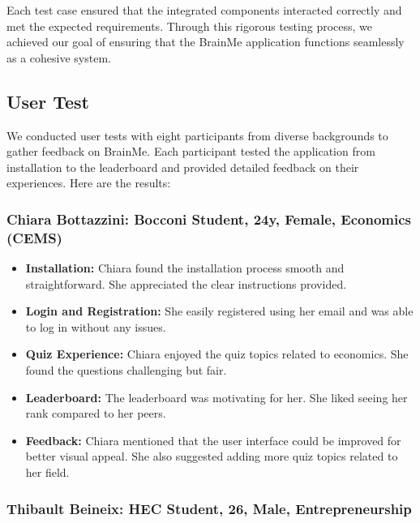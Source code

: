 Each test case ensured that the integrated components interacted correctly and met the expected requirements. Through this rigorous testing process, we achieved our goal of ensuring that the BrainMe application functions seamlessly as a cohesive system.

\subsection{User Test}

We conducted user tests with eight participants from diverse backgrounds to gather feedback on BrainMe. Each participant tested the application from installation to the leaderboard and provided detailed feedback on their experiences. Here are the results:

\subsubsection{Chiara Bottazzini: Bocconi Student, 24y, Female, Economics (CEMS)}

\begin{itemize}
    \item \textbf{Installation:} Chiara found the installation process smooth and straightforward. She appreciated the clear instructions provided.
    \item \textbf{Login and Registration:} She easily registered using her email and was able to log in without any issues. 
    \item \textbf{Quiz Experience:} Chiara enjoyed the quiz topics related to economics. She found the questions challenging but fair. 
    \item \textbf{Leaderboard:} The leaderboard was motivating for her. She liked seeing her rank compared to her peers.
    \item \textbf{Feedback:} Chiara mentioned that the user interface could be improved for better visual appeal. She also suggested adding more quiz topics related to her field.
\end{itemize}

\subsubsection{Thibault Beineix: HEC Student, 26, Male, Entrepreneurship}

